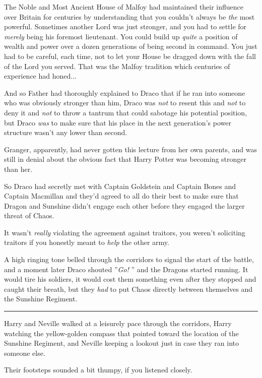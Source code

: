 The Noble and Most Ancient House of Malfoy had maintained their
influence over Britain for centuries by understanding that you couldn't
always be \emph{the} most powerful. Sometimes another Lord was just
stronger, and you had to settle for \emph{merely} being his foremost
lieutenant. You could build up \emph{quite} a position of wealth and
power over a dozen generations of being second in command. You just had
to be careful, each time, not to let your House be dragged down with the
fall of the Lord you served. That was the Malfoy tradition which
centuries of experience had honed...

And so Father had thoroughly explained to Draco that if he ran into
someone who was obviously stronger than him, Draco was \emph{not} to
resent this and \emph{not} to deny it and \emph{not} to throw a tantrum
that could sabotage his potential position, but Draco \emph{was} to make
sure that his place in the next generation's power structure wasn't any
lower than second.

Granger, apparently, had never gotten this lecture from her own parents,
and was still in denial about the obvious fact that Harry Potter was
becoming stronger than her.

So Draco had secretly met with Captain Goldstein and Captain Bones and
Captain Macmillan and they'd agreed to all do their best to make sure
that Dragon and Sunshine didn't engage each other before they engaged
the larger threat of Chaos.

It wasn't \emph{really} violating the agreement against traitors, you
weren't soliciting traitors if you honestly meant to \emph{help} the
other army.

A high ringing tone belled through the corridors to signal the start of
the battle, and a moment later Draco shouted ''\emph{Go!} '' and the
Dragons started running. It would tire his soldiers, it would cost them
something even after they stopped and caught their breath, but they
\emph{had} to put Chaos directly between themselves and the Sunshine
Regiment.

\begin{center}\rule{3in}{0.4pt}\end{center}

Harry and Neville walked at a leisurely pace through the corridors,
Harry watching the yellow-golden compass that pointed toward the
location of the Sunshine Regiment, and Neville keeping a lookout just in
case they ran into someone else.

Their footsteps sounded a bit thumpy, if you listened closely.


